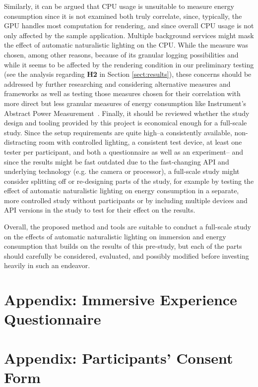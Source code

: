 \documentclass[12pt,twoside,english]{article}
\begin{document}
Similarly, it can be argued that \gls{CPU} usage is unsuitable to measure energy consumption since it is not examined both truly correlate, since, typically, the \gls{GPU} handles most computation for rendering, and since overall \gls{CPU} usage is not only affected by the sample application.
Multiple background services might mask the effect of automatic naturalistic lighting on the \gls{CPU}.
While the measure was chosen, among other reasons, because of its granular logging possibilities and while it seems to be affected by the rendering condition in our preliminary testing (see the analysis regarding \textbf{H2} in Section \ref{sect:results}), these concerns should be addressed by further researching and considering alternative measures and frameworks as well as testing those measures chosen for their correlation with more direct but less granular measures of energy consumption like Instrument's Abstract Power Measurement~\cite{apple_abstract_2020}.
Finally, it should be reviewed whether the study design and tooling provided by this project is economical enough for a full-scale study.
Since the setup requirements are quite high--a consistently available, non-distracting room with controlled lighting, a consistent test device, at least one tester per participant, and both a questionnaire as well as an experiment-- and since the results might be fast outdated due to the fast-changing API and underlying technology (e.g. the camera or processor), a full-scale study might consider splitting off or re-designing parts of the study, for example by testing the effect of automatic naturalistic lighting on energy consumption in a separate, more controlled study without participants or by including multiple devices and API versions in the study to test for their effect on the results.

Overall, the proposed method and tools are suitable to conduct a full-scale study on the effects of automatic naturalistic lighting on immersion and energy consumption that builds on the results of this pre-study, but each of the parts should carefully be considered, evaluated, and possibly modified before investing heavily in such an endeavor.



% 


\appendix
\section{Appendix: Immersive Experience Questionnaire}
\label{sect:appendix}
\label{sect:ieq}

\section{Appendix: Participants' Consent Form}
\label{sect:consent-form}

\clearpage
\end{document}
